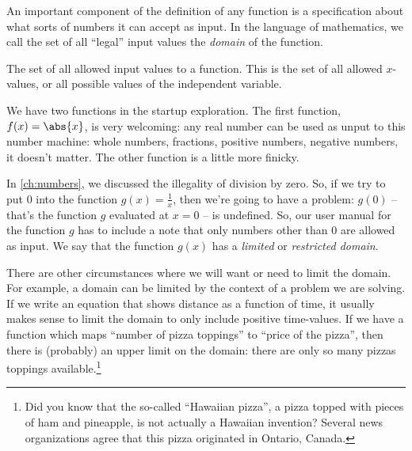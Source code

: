 An important component of the definition of any function is a specification about what sorts of numbers it can accept as input. In the language of mathematics, we call the set of all ``legal'' input values the \textit{domain} of the function.

\begin{boxeddef}[Domain]
The set of all allowed input values to a function. This is the set of all allowed $x$-values, or all possible values of the independent variable.
\end{boxeddef}

We have two functions in the startup exploration. The first function, $f(x)=\abs{x}$, is very welcoming: any real number can be used as unput to this number machine: whole numbers, fractions, positive numbers, negative numbers, it doesn't matter. The other function is a little more finicky.

In \cref{ch:numbers}, we discussed the illegality of division by zero. So, if we try to put 0 into the function $g(x)=\frac{1}{x}$, then we're going to have a problem: $g(0)$ -- that's the function $g$ evaluated at $x=0$ -- is undefined. So, our user manual for the function $g$ has to include a note that only numbers other than 0 are allowed as input. We say that the function $g(x)$ has a \textit{limited} or \textit{restricted domain}.


There are other circumstances where we will want or need to limit the domain. For example, a domain can be limited by the context of a problem we are solving. If we write an equation that shows distance as a function of time, it usually makes sense to limit the domain to only include positive time-values. If we have a function which maps ``number of pizza toppings'' to ``price of the pizza'', then there is (probably) an upper limit on the domain: there are only so many pizzas toppings available.\footnote{Did you know that the so-called ``Hawaiian pizza'', a pizza topped with pieces of ham and pineapple, is not actually a Hawaiian invention? Several news organizations agree that this pizza originated in Ontario, Canada.}

